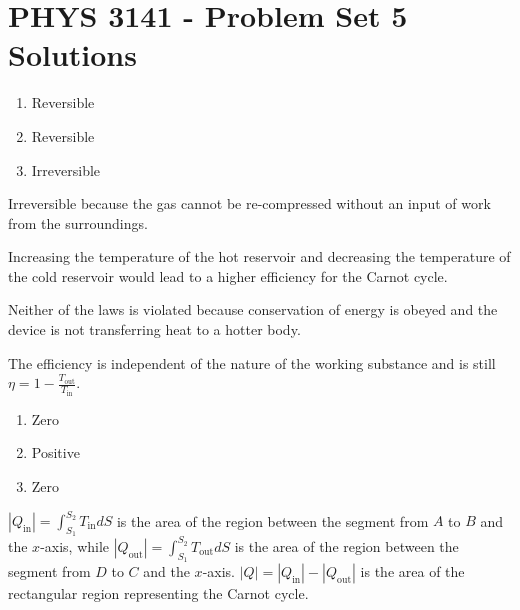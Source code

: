 \documentclass[a4paper,12pt]{article}
\begin{document}
\section*{PHYS 3141 - Problem Set 5 Solutions}

\begin{enumerate}[label=\textbf{[\arabic*]}]
    \item
        \begin{enumerate}
            \item
                Reversible
            \item
                Reversible
            \item
                Irreversible
        \end{enumerate}

    \item
        Irreversible because the gas cannot be re-compressed without an input of work from the surroundings.

    \item
        Increasing the temperature of the hot reservoir and decreasing the temperature of the cold reservoir would lead to a higher efficiency for the Carnot cycle.

    \item
        Neither of the laws is violated because conservation of energy is obeyed and the device is not transferring heat to a hotter body.

    \item
        The efficiency is independent of the nature of the working substance and is still $\eta = 1 - \frac{T_\text{out}}{T_\text{in}}$.

    \item
        \begin{enumerate}
            \item
                Zero
            \item
                Positive
            \item
                Zero
        \end{enumerate}

    \item
        $|Q_\text{in}| = \int_{S_1}^{S_2} T_\text{in} dS$ is the area of the region between the segment from $A$ to $B$ and the $x$-axis, while $|Q_\text{out}| = \int_{S_1}^{S_2} T_\text{out} dS$ is the area of the region between the segment from $D$ to $C$ and the $x$-axis. $|Q| = |Q_\text{in}| - |Q_\text{out}|$ is the area of the rectangular region representing the Carnot cycle. \\[1.5in]


\end{enumerate}
\end{document}
